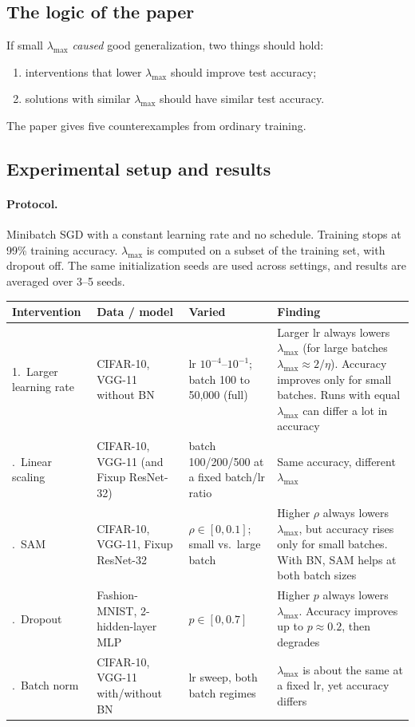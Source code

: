\documentclass[11pt]{article}
\newcommand{\lmax}{\lambda_{\max}}
\theoremstyle{plain}
\begin{document}
\subsection{The logic of the paper}

If small $\lmax$ \emph{caused} good generalization, two things should hold:
\begin{enumerate}
  \item interventions that lower $\lmax$ should improve test accuracy;
  \item solutions with similar $\lmax$ should have similar test accuracy.
\end{enumerate}
The paper gives five counterexamples from ordinary training.

\subsection{Experimental setup and results}

\paragraph{Protocol.} Minibatch SGD with a constant learning rate and no schedule. Training stops at 99\% training accuracy. $\lmax$ is computed on a subset of the training set,
with dropout off. The same initialization seeds are used across settings, and results are averaged over 3--5 seeds.

\begin{center}\small
\begin{tabularx}{\textwidth}{@{}p{2.8cm}p{3.0cm}p{3.4cm}L@{}}
\toprule
\textbf{Intervention} & \textbf{Data / model} & \textbf{Varied} & \textbf{Finding} \\
.\ Larger learning rate & CIFAR-10, VGG-11 without BN & lr $10^{-4}$--$10^{-1}$; batch 100 to 50,000 (full) &
Larger lr always lowers $\lmax$ (for large batches $\lmax \approx 2/\eta$). Accuracy improves only for small batches. Runs with equal $\lmax$ can differ a lot in accuracy \\
.\ Linear scaling & CIFAR-10, VGG-11 (and Fixup ResNet-32) & batch 100/200/500 at a fixed batch/lr ratio &
Same accuracy, different $\lmax$ \\
.\ SAM & CIFAR-10, VGG-11, Fixup ResNet-32 & $\rho\in[0,0.1]$; small vs.\ large batch &
Higher $\rho$ always lowers $\lmax$, but accuracy rises only for small batches. With BN, SAM helps at both batch sizes \\
.\ Dropout & Fashion-MNIST, 2-hidden-layer MLP & $p \in [0, 0.7]$ &
Higher $p$ always lowers $\lmax$. Accuracy improves up to $p \approx 0.2$, then degrades \\
.\ Batch norm & CIFAR-10, VGG-11 with/without BN & lr sweep, both batch regimes &
$\lmax$ is about the same at a fixed lr, yet accuracy differs \\
\bottomrule
\end{tabularx}
\end{center}
\end{document}
